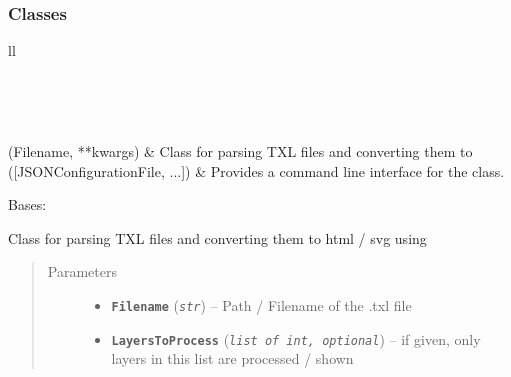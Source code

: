 \documentclass[letterpaper,10pt,english]{sphinxmanual}
\begin{document}
\subsubsection{Classes}
\label{Chapters/PythonModuleReference/TXLConverter/TXLWizard.TXLConverter:classes}
\begin{longtable}{ll}
\hline
\endfirsthead

%
{{}} \\
\hline
\endhead

\hline {} \\ \hline
\endfoot

\endlastfoot


{\hyperref[Chapters/PythonModuleReference/TXLConverter/TXLWizard.TXLConverter:TXLWizard.TXLConverter.TXLConverter]{}}(Filename, **kwargs)
 & 
Class for parsing TXL files and converting them to
\\
\hline
{\hyperref[Chapters/PythonModuleReference/TXLConverter/TXLWizard.TXLConverter:TXLWizard.TXLConverter.TXLConverterCLI]{}}({[}JSONConfigurationFile, ...{]})
 & 
Provides a command line interface for the {\hyperref[Chapters/PythonModuleReference/TXLConverter/TXLWizard.TXLConverter:TXLWizard.TXLConverter.TXLConverter]{}} class.
\\
\hline\end{longtable}


\begin{fulllineitems}
\label{Chapters/PythonModuleReference/TXLConverter/TXLWizard.TXLConverter:TXLWizard.TXLConverter.TXLConverter}
Bases: 

Class for parsing TXL files and converting them to
html / svg using {\hyperref[Chapters/PythonModuleReference/TXLWriter/TXLWizard.TXLWriter:module\string-TXLWizard.TXLWriter]{}}
\begin{quote}\begin{description}
\item[{Parameters}] \leavevmode\begin{itemize}
\item {} 
\textbf{\texttt{Filename}} (\emph{\texttt{str}}) -- Path / Filename of the .txl file

\item {} 
\textbf{\texttt{LayersToProcess}} (\emph{\texttt{list of int, optional}}) -- if given, only layers in this list are processed / shown

\end{itemize}

\end{description}\end{quote}

\end{fulllineitems}
\end{document}
